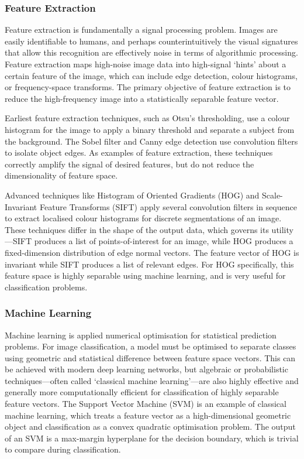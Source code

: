\documentclass[10pt, a4paper]{article}
\begin{document}
\subsubsection{Feature Extraction}
Feature extraction is fundamentally a signal processing problem. Images are easily identifiable to humans, and perhaps counterintuitively the visual signatures that allow this recognition are effectively noise in terms of algorithmic processing. Feature extraction maps high-noise image data into high-signal `hints' about a certain feature of the image, which can include edge detection, colour histograms, or frequency-space transforms. The primary objective of feature extraction is to reduce the high-frequency image into a statistically separable feature vector.

Earliest feature extraction techniques, such as Otsu's thresholding, use a colour histogram for the image to apply a binary threshold and separate a subject from the background\cite{otsu_threshold_1979}. The Sobel filter and Canny edge detection use convolution filters to isolate object edges\cite{sobel_sobel-feldman_1968,canny_computational_1986}. As examples of feature extraction, these techniques correctly amplify the signal of desired features, but do not reduce the dimensionality of feature space. 

Advanced techniques like Histogram of Oriented Gradients (HOG) and Scale-Invariant Feature Transforms (SIFT) apply several convolution filters in sequence to extract localised colour histograms for discrete segmentations of an image\cite{dalal_histograms_2005,lowe_distinctive_2004}. These techniques differ in the shape of the output data, which governs its utility---SIFT produces a list of points-of-interest for an image, while HOG produces a fixed-dimension distribution of edge normal vectors. The feature vector of HOG is invariant while SIFT produces a list of relevant edges. For HOG specifically, this feature space is highly separable using machine learning, and is very useful for classification problems.

\subsubsection{Machine Learning}

Machine learning is applied numerical optimisation for statistical prediction problems. For image classification, a model must be optimised to separate classes using geometric and statistical difference between feature space vectors. This can be achieved with modern deep learning networks, but algebraic or probabilistic techniques---often called `classical machine learning'---are also highly effective and generally more computationally efficient for classification of highly separable feature vectors. The Support Vector Machine (SVM) is an example of classical machine learning, which treats a feature vector as a high-dimensional geometric object and classification as a convex quadratic optimisation problem\cite{cortes_support-vector_1995}. The output of an SVM is a max-margin hyperplane for the decision boundary, which is trivial to compare during classification.
\end{document}
